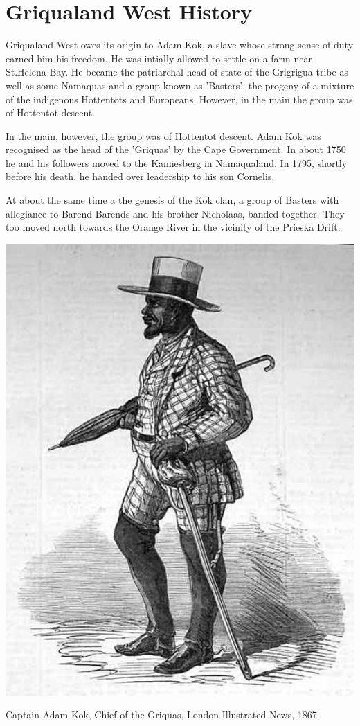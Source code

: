 \chapter{Griqualand West History}    

Griqualand West owes its origin to Adam Kok, a slave whose strong sense of duty earned him his freedom. He was intially allowed to settle on a farm near St.Helena Bay. He became the patriarchal head of state of the Grigrigua tribe as well as some Namaquas and a group known as 'Basters', the progeny of a mixture of the indigenous Hottentots and Europeans. However, in the main the group was of Hottentot descent.




In the main, however, the group was of Hottentot descent. Adam Kok was recognised as the head of the 'Griquas' by the Cape Government. In about 1750 he and his followers moved to the Kamiesberg in Namaqualand. In 1795, shortly before his death, he handed over leadership to his son Cornelis.

At about the same time a the genesis of the Kok clan, a group of Basters with allegiance to Barend Barends and his brother Nicholaas, banded together. They too moved north towards the Orange River in the vicinity of the Prieska Drift.

\begin{marginfigure}
\includegraphics[width=1.0\textwidth]{../griqualand-west/adam-kok.jpg}
\caption{Captain Adam Kok, Chief of the Griquas, London Illustrated News, 1867.}
\end{marginfigure}

